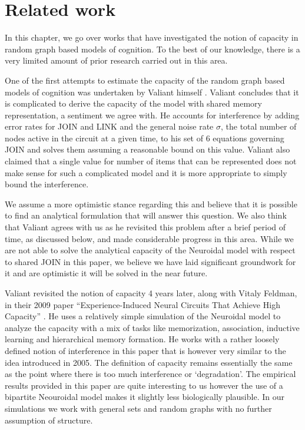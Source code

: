 \chapter{Related work}

In this chapter, we go over works that have investigated the notion of capacity in random graph based models of cognition. To the best of our knowledge, there is a very limited amount of prior research carried out in this area. 

One of the first attempts to estimate the capacity of the random graph based models of cognition was undertaken by Valiant himself \cite{valiant2005memorization}. Valiant concludes that it is complicated to derive the capacity of the model with shared memory representation, a sentiment we agree with. He accounts for interference by adding error rates for JOIN and LINK and the general noise rate $\sigma$, the total number of nodes active in the circuit at a given time, to his set of 6 equations governing JOIN and solves them assuming a reasonable bound on this value. Valiant also claimed that a single value for number of items that can be represented does not make sense for such a complicated model and it is more appropriate to simply bound the interference. 

We assume a more optimistic stance regarding this and believe that it is possible to find an analytical formulation that will answer this question. We also think that Valiant agrees with us as he revisited this problem after a brief period of time, as discussed below, and made considerable progress in this area. While we are not able to solve the analytical capacity of the Neuroidal model with respect to shared JOIN in this paper, we believe we have laid significant groundwork for it and are optimistic it will be solved in the near future.

Valiant revisited the notion of capacity 4 years later, along with Vitaly Feldman, in their 2009 paper ``Experience-Induced Neural Circuits That Achieve High Capacity'' \cite{feldman2009experience}. He uses a relatively simple simulation of the Neuroidal model to analyze the capacity with a mix of tasks like memorization, association, inductive learning and hierarchical memory formation. He works with a rather loosely defined notion of interference in this paper that is however very similar to the idea introduced in 2005. The definition of capacity remains essentially the same as the point where there is too much interference or `degradation'. The empirical results provided in this paper are quite interesting to us however the use of a bipartite Neouroidal model makes it slightly less biologically plausible. In our simulations we work with general sets and random graphs with no further assumption of structure. 

